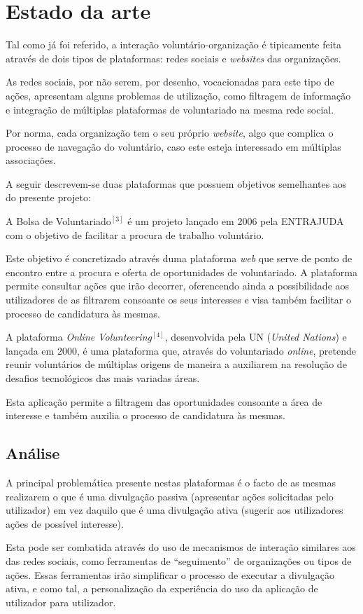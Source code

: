 \section{Estado da arte}
Tal como já foi referido, a interação voluntário-organização é tipicamente feita através de dois tipos de plataformas: redes sociais e \textit{websites} das organizações. \par \bigskip
As redes sociais, por não serem, por desenho, vocacionadas para este tipo de ações, apresentam alguns problemas de utilização, como filtragem de informação e integração de múltiplas plataformas de voluntariado na mesma rede social. \par \bigskip
Por norma, cada organização tem o seu próprio \textit{website}, algo que complica o processo de navegação do voluntário, caso este esteja interessado em múltiplas associações. \par \bigskip
A seguir descrevem-se duas plataformas que possuem objetivos semelhantes aos do presente projeto: \par \bigskip

A Bolsa de Voluntariado$^{[3]}$ é um projeto lançado em 2006 pela ENTRAJUDA com o objetivo de facilitar a procura de trabalho voluntário.  \par \medskip
Este objetivo é concretizado através duma plataforma \textit{web} que serve de ponto de encontro entre a procura e oferta de oportunidades de voluntariado. A plataforma permite consultar ações que irão decorrer, oferencendo ainda a possibilidade aos utilizadores de as filtrarem consoante os seus interesses e visa também facilitar o processo de candidatura às mesmas. \par \bigskip

A plataforma \textit{Online Volunteering}$^{[4]}$, desenvolvida pela UN (\textit{United Nations}) e lançada em 2000, é uma plataforma que, através do voluntariado \textit{online}, pretende reunir voluntários de múltiplas origens de maneira a auxiliarem na resolução de desafios tecnológicos das mais variadas áreas.  \par \medskip
Esta aplicação permite a filtragem das oportunidades consoante a área de interesse e também auxilia o processo de candidatura às mesmas. \bigskip

\subsection{Análise}
A principal problemática presente nestas plataformas é o facto de as mesmas realizarem o que é uma divulgação passiva (apresentar ações solicitadas pelo utilizador) em vez daquilo que é uma divulgação ativa (sugerir aos utilizadores ações de possível interesse). \par \bigskip
Esta pode ser combatida através do uso de mecanismos de interação similares aos das redes sociais, como ferramentas de “seguimento” de organizações ou tipos de ações. Essas ferramentas irão simplificar o processo de executar a divulgação ativa, e como tal, a personalização da experiência do uso da aplicação de utilizador para utilizador. \par \bigskip

